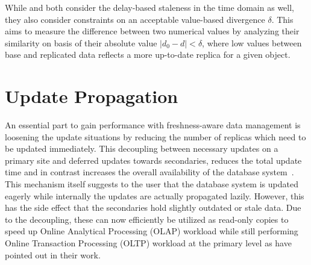 While \cite{xiang:2008} and \cite{fekete:2018} both consider the delay-based staleness in the time domain as well, they also consider constraints on 
an acceptable value-based divergence $\delta$. This aims to measure the difference between two numerical values by analyzing their similarity on basis of their 
absolute value $|d_0 - d| < \delta $, where low values between base and replicated data reflects a more up-to-date replica for a given object.




\section{Update Propagation}
\label{r:replication}
An essential part to gain performance with freshness-aware data management is loosening the update situations by reducing the number of 
replicas which need to be updated immediately. This decoupling between necessary updates on a primary site and deferred updates towards secondaries, 
reduces the total update time and in contrast increases the overall availability of the database system~\cite{quorums:2003}.
This mechanism itself suggests to the user that the database system is updated eagerly while internally the updates are actually propagated lazily. 
However, this has the side effect that the secondaries hold slightly outdated or stale data.
Due to the decoupling, these can now efficiently be utilized as read-only copies to speed up Online Analytical Processing (OLAP) workload while still performing 
Online Transaction Processing (OLTP) workload
at the primary level as \cite{psaroudakis:2015, rohm:2002, xiang:2008} have pointed out in their work.

